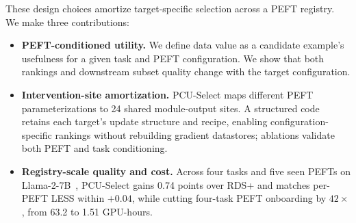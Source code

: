 These design choices amortize target-specific selection across a PEFT registry. We make three contributions:
\begin{itemize}
    \item \textbf{PEFT-conditioned utility.} We define data value as a candidate example's usefulness for a given task and PEFT configuration. We show that both rankings and downstream subset quality change with the target configuration.
    \item \textbf{Intervention-site amortization.} PCU-Select maps different PEFT parameterizations to 24 shared module-output sites. A structured code retains each target's update structure and recipe, enabling configuration-specific rankings without rebuilding gradient datastores; ablations validate both PEFT and task conditioning.
    \item \textbf{Registry-scale quality and cost.} Across four tasks and five seen PEFTs on Llama-2-7B~\cite{touvron2023llama2}, PCU-Select gains 0.74 points over RDS+ and matches per-PEFT LESS within $+0.04$, while cutting four-task PEFT onboarding by $42\times$, from 63.2 to 1.51 GPU-hours.
\end{itemize}
